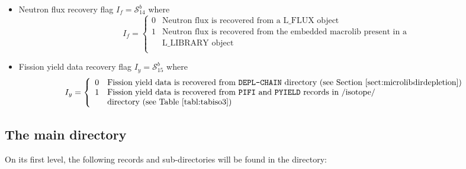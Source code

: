 \begin{itemize}
\item Neutron flux recovery flag $I_{f}=\mathcal{S}^{b}_{14}$ where
\vskip -0.8cm
\begin{displaymath}
I_{f} = \left\{
\begin{array}{rl}
 0 & \textrm{Neutron flux is recovered from a L\_FLUX object} \\
 1 & \textrm{Neutron flux is recovered from the embedded macrolib present in a} \\
 & \textrm{L\_LIBRARY object} \\
\end{array} \right.
\end{displaymath}

\item Fission yield data recovery flag $I_{y}=\mathcal{S}^{b}_{15}$ where
\vskip -0.8cm
\begin{displaymath}
I_{y} = \left\{
\begin{array}{rl}
 0 & \textrm{Fission yield data is recovered from {\tt DEPL-CHAIN} directory (see \Sect{microlibdirdepletion})} \\
 1 & \textrm{Fission yield data is recovered from {\tt PIFI} and {\tt PYIELD} records in /isotope/} \\
 & \textrm{directory (see Table~\ref{tabl:tabiso3})} \\
\end{array} \right.
\end{displaymath}
\end{itemize}

\subsection{The main  directory}\label{sect:burnupdirmain}

On its first level, the
following records and sub-directories will be found in the  directory:

